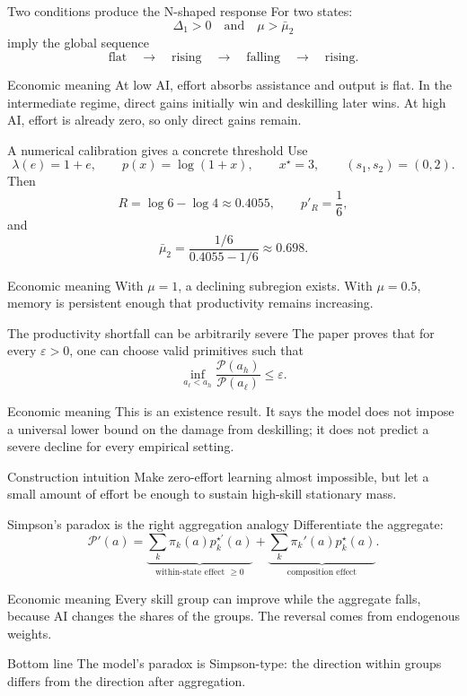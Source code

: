\documentclass[aspectratio=169,11pt]{beamer}
\newcommand{\calP}{\mathcal{P}}
\newcommand{\econmeaning}[1]{%
  \begin{block}{Economic meaning}
  #1
  \end{block}}
\newcommand{\bottomline}[1]{%
  \begin{alertblock}{Bottom line}
  #1
  \end{alertblock}}
\begin{document}
\begin{frame}{Two conditions produce the N-shaped response}
For two states:
\[
\boxed{\Delta_1>0
\quad\text{and}\quad
\mu>\bar\mu_2}
\]
imply the global sequence
\[
\text{flat}
\quad\longrightarrow\quad
\text{rising}
\quad\longrightarrow\quad
\text{falling}
\quad\longrightarrow\quad
\text{rising}.
\]
\econmeaning{At low AI, effort absorbs assistance and output is flat. In the intermediate regime, direct gains initially win and deskilling later wins. At high AI, effort is already zero, so only direct gains remain.}
\end{frame}

\begin{frame}{A numerical calibration gives a concrete threshold}
Use
\[
\lambda(e)=1+e,
\qquad
p(x)=\log(1+x),
\qquad
x^\star=3,
\qquad
(s_1,s_2)=(0,2).
\]
Then
\[
R=\log 6-\log 4\approx0.4055,
\qquad
p'_R=\frac16,
\]
and
\[
\boxed{\bar\mu_2
=\frac{1/6}{0.4055-1/6}
\approx0.698.}
\]
\econmeaning{With $\mu=1$, a declining subregion exists. With $\mu=0.5$, memory is persistent enough that productivity remains increasing.}
\end{frame}

\begin{frame}{The productivity shortfall can be arbitrarily severe}
The paper proves that for every $\varepsilon>0$, one can choose valid primitives such that
\[
\boxed{
\inf_{a_\ell<a_h}
\frac{\calP(a_h)}{\calP(a_\ell)}
\le\varepsilon.}
\]
\econmeaning{This is an existence result. It says the model does not impose a universal lower bound on the damage from deskilling; it does not predict a severe decline for every empirical setting.}
\begin{exampleblock}{Construction intuition}
Make zero-effort learning almost impossible, but let a small amount of effort be enough to sustain high-skill stationary mass.
\end{exampleblock}
\end{frame}

\begin{frame}{Simpson's paradox is the right aggregation analogy}
Differentiate the aggregate:
\[
\boxed{
\calP'(a)=
\underbrace{\sum_k\pi_k(a)p_k^{\star\prime}(a)}_{\text{within-state effect }\ge0}
+
\underbrace{\sum_k\pi_k'(a)p_k^\star(a)}_{\text{composition effect}}.}
\]
\econmeaning{Every skill group can improve while the aggregate falls, because AI changes the shares of the groups. The reversal comes from endogenous weights.}
\bottomline{The model's paradox is Simpson-type: the direction within groups differs from the direction after aggregation.}
\end{frame}
\end{document}
